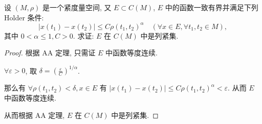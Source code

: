 \problem[1.3.9] 设 $(M,\rho)$ 是一个紧度量空间, 又 $E\subset C(M)$, $E$ 中的函数一致有界并满足下列 Holder 条件: $$|x(t_1)-x(t_2)|\leqslant C\rho(t_1,t_2)^\alpha\quad (\forall x\in E, \forall t_1,t_2\in M),$$ 其中 $0<\alpha\leqslant 1, C>0$. 求证: $E$ 在 $C(M)$ 中是列紧集.

\begin{proof}
	根据 AA 定理, 只需证 $E$ 中函数等度连续.
	
	$\forall \varepsilon>0$, 取 $\delta=\left(\frac{\varepsilon}{C}\right)^{1/\alpha}$.
	
	那么有 $\forall \rho(t_1,t_2)<\delta, x\in E$ 有 $|x(t_1)-x(t_2)|\leqslant C\rho(t_1,t_2)^\alpha<\varepsilon$. 从而 $E$ 中函数等度连续.
	
	从而根据 AA 定理, $E$ 在 $C(M)$ 中是列紧集.
	
	
\end{proof}
